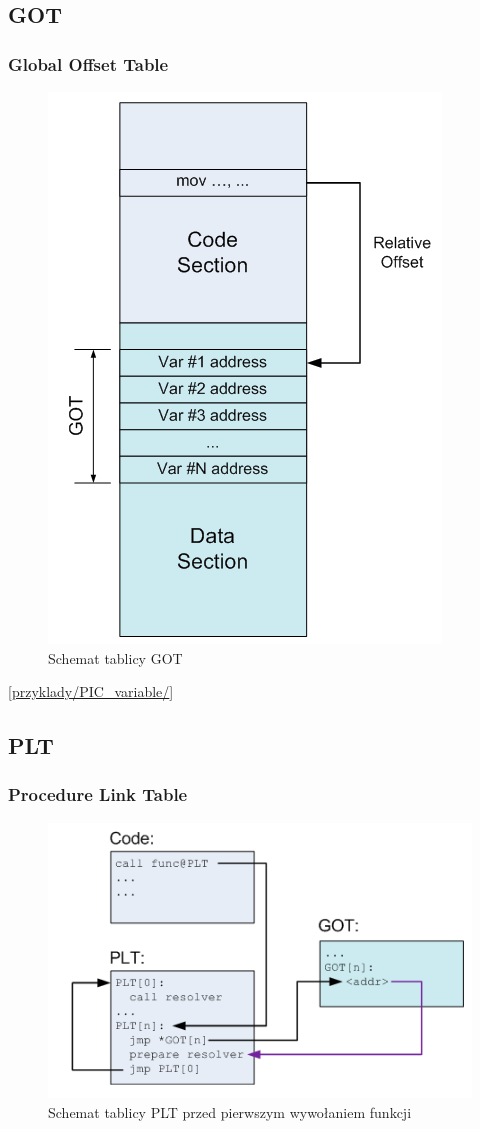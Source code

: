 \subsection{GOT}
\begin{frame}[t]\frametitle{Global Offset Table}
  \begin{figure}
    \includegraphics[height=0.65\textheight]{GOT.png}
    \caption{Schemat tablicy GOT\cite{PIC}}
  \end{figure}
  [\url{przyklady/PIC_variable/}]
\end{frame}
\subsection{PLT}
\begin{frame}[t]\frametitle{Procedure Link Table}
  \begin{figure}
    \includegraphics[height=0.65\textheight]{PLT.png}
    \caption{Schemat tablicy PLT przed pierwszym wywołaniem funkcji\cite{PIC}}
  \end{figure}
\end{frame}



